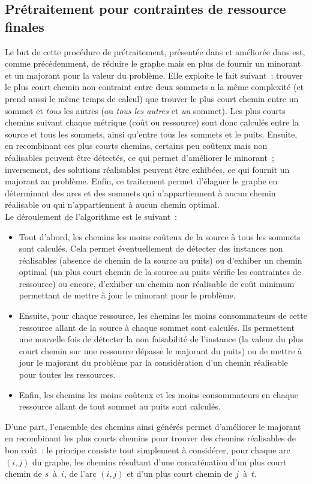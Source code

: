 \documentclass[10pt,francais]{llncs}
\begin{document}
\subsection{Pr\'etraitement pour contraintes de ressource finales}\label{sub-reduc-final}
Le but de cette proc\'edure de pr\'etraitement, pr\'esent\'ee dans \cite{Aneja1983} et am\'elior\'ee dans\cite{Dumitrescu2003} est, comme pr\'ec\'edemment, de r\'eduire le graphe mais en plus de fournir un minorant et un majorant pour la valeur du probl\`eme. Elle exploite le fait suivant~: trouver le plus court chemin non contraint entre deux sommets a la m\^eme complexit\'e (et prend aussi le m\^eme temps de calcul) que trouver le plus court chemin entre un sommet et {\em tous} les autres (ou {\em tous les autres} et {\em un} sommet). Les plus courts chemins suivant chaque m\'etrique (co\^ut ou ressource) sont donc calcul\'es entre la source et tous les sommets, ainsi qu'entre tous les sommets et le puits. Ensuite, en recombinant ces plus courts chemins, certains peu co\^uteux mais non r\'ealisables peuvent \^etre d\'etect\'es, ce qui permet d'am\'eliorer le minorant~; inversement,  des solutions r\'ealisables peuvent \^etre exhib\'ees, ce qui fournit un majorant au probl\`eme. Enfin, ce traitement permet d'\'elaguer le graphe en d\'eterminant des arcs et des sommets qui n'appartiennent \`a aucun chemin r\'ealisable ou qui n'appartiennent \`a aucun chemin optimal.\\

\noindent Le d\'eroulement de l'algorithme est le suivant~:
\begin{itemize}
 \item Tout d'abord, les chemins les moins co\^uteux de la source \`a tous les sommets sont calcul\'es. Cela permet \'eventuellement de d\'etecter des instances non r\'ealisables (absence de chemin de la source au puits) ou d'exhiber un chemin optimal (un plus court chemin de la source au puits v\'erifie les contraintes de ressource) ou encore, d'exhiber un chemin non r\'ealisable de co\^ut minimum permettant de mettre \`a jour le minorant pour le probl\`eme.
 \item Ensuite, pour chaque ressource, les chemins les moins consommateurs de cette ressource allant de la source \`a chaque sommet sont calcul\'es. Ils permettent une nouvelle fois de d\'etecter la non faisabilit\'e de l'instance (la valeur du plus court chemin sur une ressource d\'epasse le majorant du puits) ou de mettre \`a jour le majorant du probl\`eme par la consid\'eration d'un chemin r\'ealisable pour toutes les ressources.
 \item Enfin, les chemins les moins co\^uteux et les moins consommateurs en chaque ressource allant de tout sommet au puits sont calcul\'es.
\end{itemize}
D'une part, l'ensemble des chemins ainsi g\'en\'er\'es permet d'am\'eliorer le majorant en recombinant les plus courts chemins pour trouver des chemins r\'ealisables de bon co\^ut~: le principe consiste tout simplement \`a consid\'erer, pour chaque arc $(i,j)$ du graphe, les chemins r\'esultant d'une concat\'enation d'un plus court chemin de $s$~\`a~$i$, de l'arc $(i,j)$ et d'un plus court chemin de $j$~\`a~$t$.
\end{document}

